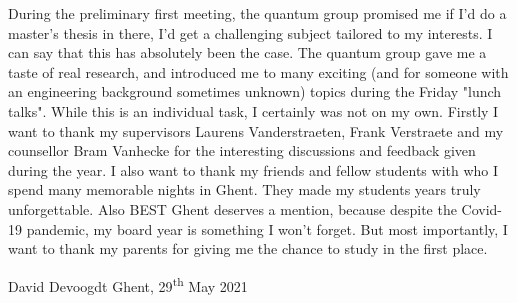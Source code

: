 During the preliminary first meeting, the quantum group promised me if I'd do a master's thesis in there, I'd get a challenging subject tailored to my interests. I can say that this has absolutely been the case. The quantum group gave me a taste of real research, and introduced me to many exciting (and for someone with an engineering background sometimes unknown) topics during the Friday "lunch talks".
While this is an individual task, I certainly was not on my own. Firstly I want to thank my supervisors Laurens Vanderstraeten, Frank Verstraete and my counsellor Bram Vanhecke for the interesting discussions and feedback given during the year.
I also want to thank my friends and fellow students with who I spend many memorable nights in Ghent. They made my students years truly unforgettable. Also BEST Ghent deserves a mention, because despite the Covid-19 pandemic, my board year is something I won't forget. But most importantly, I want to thank my parents for giving me the chance to study in the first place.

David Devoogdt
Ghent, 29\textsuperscript{th} May 2021
